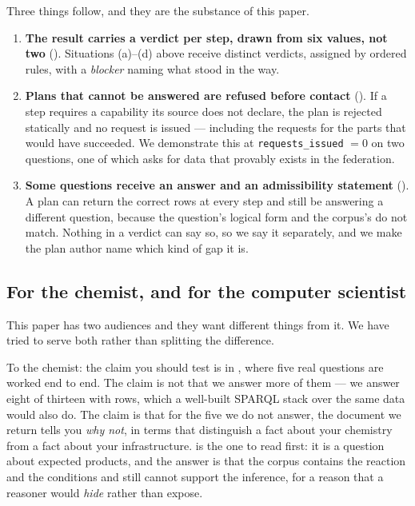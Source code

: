 \documentclass[11pt,a4paper]{article}
\theoremstyle{plain}
\theoremstyle{definition}
\theoremstyle{remark}
\begin{document}
Three things follow, and they are the substance of this paper.

\begin{enumerate}[leftmargin=2.2em]
\item \textbf{The result carries a verdict per step, drawn from six
  values, not two} (). Situations (a)--(d) above
  receive distinct verdicts, assigned by ordered rules, with a
  \emph{blocker} naming what stood in the way.

\item \textbf{Plans that cannot be answered are refused before contact}
  (). If a step requires a capability its source does
  not declare, the plan is rejected statically and no request is issued
  --- including the requests for the parts that would have succeeded. We
  demonstrate this at \texttt{requests\_issued} $= 0$ on two questions,
  one of which asks for data that provably exists in the federation.

\item \textbf{Some questions receive an answer and an admissibility
  statement} (). A plan can return the correct
  rows at every step and still be answering a different question,
  because the question's logical form and the corpus's do not match.
  Nothing in a verdict can say so, so we say it separately, and we make
  the plan author name which kind of gap it is.
\end{enumerate}

\subsection{For the chemist, and for the computer scientist}

This paper has two audiences and they want different things from it. We
have tried to serve both rather than splitting the difference.

To the chemist: the claim you should test is in ,
where five real questions are worked end to end. The claim is not that
we answer more of them --- we answer eight of thirteen with rows, which
a well-built SPARQL stack over the same data would also do. The claim is
that for the five we do not answer, the document we return tells you
\emph{why not}, in terms that distinguish a fact about your chemistry
from a fact about your infrastructure.  is the one to read
first: it is a question about expected products, and the answer is
that the corpus contains the reaction and the conditions and still
cannot support the inference, for a reason that a reasoner would
\emph{hide} rather than expose.
\end{document}
